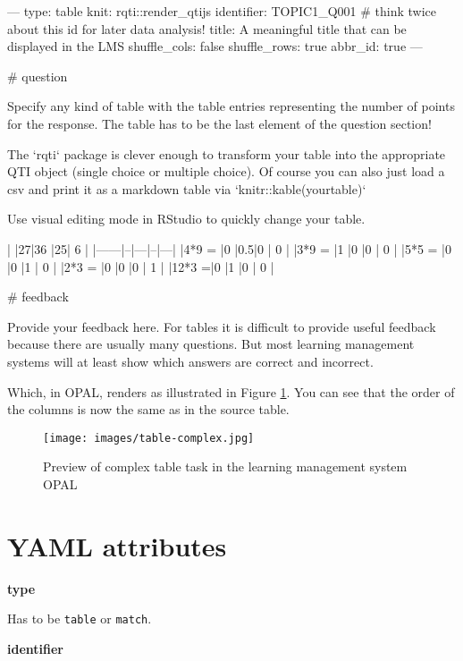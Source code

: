\documentclass[twoside]{tufte-book}
\newenvironment{Shaded}{}{}
\begin{document}
\begin{Shaded}
\begin{Highlighting}
---
type: table
knit: rqti::render_qtijs
identifier: TOPIC1_Q001 # think twice about this id for later data analysis!
title: A meaningful title that can be displayed in the LMS
shuffle_cols: false
shuffle_rows: true
abbr_id: true
---

# question

Specify any kind of table with the table entries representing the number of
points for the response. The table has to be the last element of the question
section!

The `rqti` package is clever enough to transform your table into the appropriate
QTI object (single choice or multiple choice). Of course you can also just load
a csv and print it as a markdown table via `knitr::kable(yourtable)`

Use visual editing mode in RStudio to quickly change your table.

|      |27|36 |25| 6 |
|------|--|---|--|---|
|4*9 = |0 |0.5|0 | 0 |
|3*9 = |1 |0  |0 | 0 |
|5*5 = |0 |0  |1 | 0 |
|2*3 = |0 |0  |0 | 1 |
|12*3 =|0 |1  |0 | 0 |


# feedback

Provide your feedback here. For tables it is difficult to provide useful
feedback because there are usually many questions. But most learning management
systems will at least show which answers are correct and incorrect.
\end{Highlighting}
\end{Shaded}

Which, in OPAL, renders as illustrated in Figure \ref{tbl2opal}. You can see that the order of the columns is now the same as in the source table.

\begin{figure}[htb]
\centering
\texttt{[image: images/table-complex.jpg]}
\caption{\label{tbl2opal}Preview of complex table task in the learning management system OPAL}
\end{figure}

\section{YAML attributes}\label{YAML-attributes-7}

\noindent\textbf{type}\label{type-7}

Has to be \texttt{table} or \texttt{match}.

\noindent\textbf{identifier}\label{identifier-7}
\end{document}
